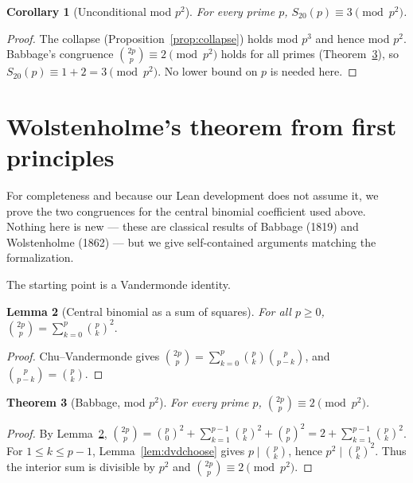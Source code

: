 \documentclass[11pt,a4paper]{article}
\newtheorem{theorem}{Theorem}[section]
\newtheorem{lemma}[theorem]{Lemma}
\newtheorem{corollary}[theorem]{Corollary}
\theoremstyle{definition}
\theoremstyle{remark}
\newcommand{\Sx}{S_{20}}
\begin{document}
\begin{corollary}[Unconditional mod $p^2$]\label{cor:modsq}
For \emph{every} prime $p$, $\Sx(p)\equiv 3\pmod{p^{2}}$.
\end{corollary}

\begin{proof}
The collapse (Proposition~\ref{prop:collapse}) holds mod $p^{3}$ and hence mod
$p^{2}$.  Babbage's congruence $\binom{2p}{p}\equiv 2\pmod{p^{2}}$ holds for all
primes (Theorem~\ref{thm:babbage}), so $\Sx(p)\equiv 1+2=3\pmod{p^2}$.  No lower
bound on $p$ is needed here.
\end{proof}

\section{Wolstenholme's theorem from first principles}\label{sec:wolstenholme}

For completeness and because our Lean development does not assume it, we prove
the two congruences for the central binomial coefficient used above.  Nothing
here is new --- these are classical results of Babbage (1819) and Wolstenholme
(1862) --- but we give self-contained arguments matching the formalization.

The starting point is a Vandermonde identity.

\begin{lemma}[Central binomial as a sum of squares]\label{lem:vandermonde}
For all $p\ge 0$, $\displaystyle \binom{2p}{p}=\sum_{k=0}^{p}\binom{p}{k}^{2}.$
\end{lemma}

\begin{proof}
Chu--Vandermonde gives $\binom{2p}{p}=\sum_{k=0}^{p}\binom{p}{k}\binom{p}{p-k}$,
and $\binom{p}{p-k}=\binom{p}{k}$.
\end{proof}

\begin{theorem}[Babbage, mod $p^2$]\label{thm:babbage}
For every prime $p$, $\binom{2p}{p}\equiv 2\pmod{p^{2}}$.
\end{theorem}

\begin{proof}
By Lemma~\ref{lem:vandermonde},
$\binom{2p}{p}=\binom{p}{0}^2+\sum_{k=1}^{p-1}\binom{p}{k}^2+\binom{p}{p}^2
 = 2+\sum_{k=1}^{p-1}\binom{p}{k}^{2}$.
For $1\le k\le p-1$, Lemma~\ref{lem:dvdchoose} gives $p\mid\binom{p}{k}$, hence
$p^{2}\mid\binom{p}{k}^{2}$.  Thus the interior sum is divisible by $p^{2}$ and
$\binom{2p}{p}\equiv 2\pmod{p^2}$.
\end{proof}
\end{document}
